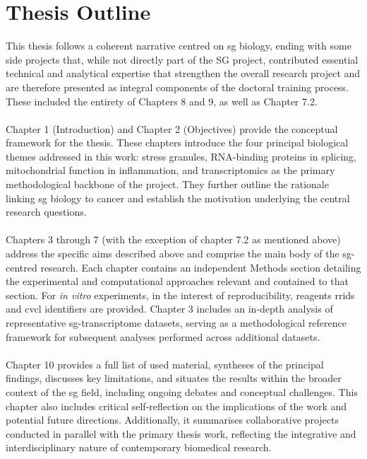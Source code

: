 \section{Thesis Outline}

This thesis follows a coherent narrative centred on \gls{sg} biology, ending with some side projects that, while not directly part of the SG project, contributed essential technical and analytical expertise that strengthen the overall research project and are therefore presented as integral components of the doctoral training process. These included the entirety of Chapters 8 and 9, as well as Chapter 7.2.
\\
\\
Chapter 1 (Introduction) and Chapter 2 (Objectives) provide the conceptual framework for the thesis. These chapters introduce the four principal biological themes addressed in this work: stress granules, RNA-binding proteins in splicing, mitochondrial function in inflammation, and transcriptomics as the primary methodological backbone of the project. They further outline the rationale linking \gls{sg} biology to cancer and establish the motivation underlying the central research questions.
\\
\\
Chapters 3 through 7 (with the exception of chapter 7.2 as mentioned above) address the specific aims described above and comprise the main body of the \gls{sg}-centred research. Each chapter contains an independent Methods section detailing the experimental and computational approaches relevant and contained to that section. For \textit{in vitro} experiments, in the interest of reproducibility, reagents \glspl{rrid} and \gls{cvcl} identifiers are provided. Chapter 3 includes an in-depth analysis of representative \gls{sg}-transcriptome datasets, serving as a methodological reference framework for subsequent analyses performed across additional datasets.
\\
\\
Chapter 10 provides a full list of used material, syntheses of the principal findings, discusses key limitations, and situates the results within the broader context of the \gls{sg} field, including ongoing debates and conceptual challenges. This chapter also includes critical self-reflection on the implications of the work and potential future directions. Additionally, it summarises collaborative projects conducted in parallel with the primary thesis work, reflecting the integrative and interdisciplinary nature of contemporary biomedical research.


